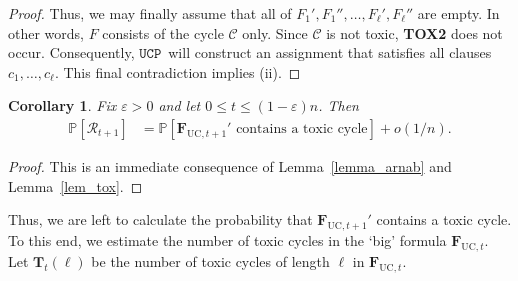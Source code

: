 \documentclass[10pt,reqno]{amsart}
\numberwithin{equation}{section}
\renewcommand{\vec}[1]{\boldsymbol{#1}}
\newcommand{\FUC}[1]{\PHI_{\mathrm{UC},{#1}}}
\newcommand{\UCP}{\ensuremath{\mathtt{UCP}}}
\newcommand\PHI{\vec F}
\newcommand\cC{\mathcal C}
\newcommand\cR{\mathcal R}
\newcommand\vT{\vec T}
\newcommand\eps{\varepsilon}
\newcommand\brk[1]{\left\lbrack{#1}\right\rbrack}
\newcommand\pr{\mathbb{P}}
\newcommand\Lem{Lemma}
\newtheorem{corollary}[definition]{Corollary}
\def\pr{{\mathbb P}}
\begin{document}
\begin{proof}
	Thus, we may finally assume that all of $F_1',F_1'',\ldots,F_\ell',F_\ell''$ are empty.
	In other words, $F$ consists of the cycle $\cC$ only.
	Since $\cC$ is not toxic, {\bf TOX2} does not occur.
	Consequently, \UCP\ will construct an assignment that satisfies all clauses $c_1,\ldots,c_\ell$.
	This final contradiction implies (ii).
\end{proof}
	
\begin{corollary}\label{lem_tox_error_t}
	Fix $\eps>0$ and let $0\leq t\leq(1-\eps)n$.
	Then
	\begin{align*}
		\pr\brk{\cR_{t+1}}&=\pr\brk{\mbox{$\FUC{t+1}'$ contains a toxic cycle}}+o(1/n).
	\end{align*}
\end{corollary}
\begin{proof}
	This is an immediate consequence of \Lem~\ref{lemma_arnab} and \Lem~\ref{lem_tox}.
\end{proof}

	Thus, we are left to calculate the probability that $\FUC{t+1}'$ contains a toxic cycle.
	To this end, we estimate the number of toxic cycles in the `big' formula $\FUC t$.
	Let $\vT_{t}(\ell)$ be the number of toxic cycles of length $\ell$ in $\FUC t$.
\end{document}
